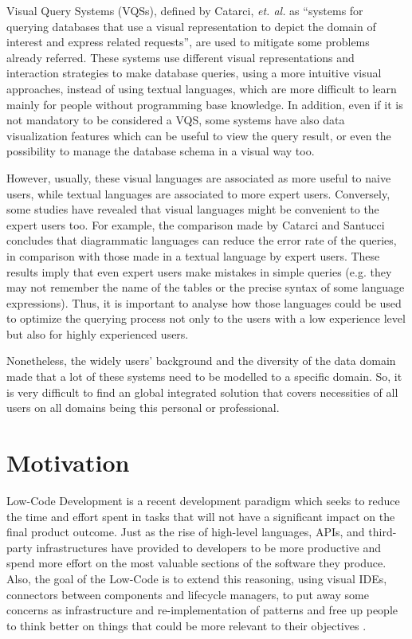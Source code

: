 Visual Query Systems (VQSs), defined by Catarci, \textit{et. al.} \cite{visualQuerySystemsForDatabases_aSurvey} as “systems for querying databases that use a visual representation to depict the domain of interest and express related requests”, are used to mitigate some problems already referred. These systems use different visual representations and interaction strategies to make database queries, using a more intuitive visual approaches, instead of using textual languages, which are more difficult to learn mainly for people without programming base knowledge. In addition, even if it is not mandatory to be considered a VQS, some systems have also data visualization features which can be useful to view the query result, or even the possibility to manage the database schema in a visual way too.

However, usually, these visual languages are associated as more useful to naive users, while textual languages are associated to more expert users.  Conversely, some studies have revealed that visual languages might be convenient to the expert users too. For example, the comparison made by Catarci and Santucci \cite{diagrammaticVsTextualQueryLanguages_aComparativeExperiment} concludes that diagrammatic languages can reduce the error rate of the queries, in comparison with those made in a textual language by expert users. These results imply that even expert users make mistakes in simple queries (e.g. they may not remember the name of the tables or the precise syntax of some language expressions). Thus, it is important to analyse how those languages could be used to optimize the querying process not only to the users with a low experience level but also for highly experienced users.

 Nonetheless, the widely users’ background and the diversity of the data domain made that a lot of these systems need to be modelled to a specific domain. So, it is very difficult to find an global integrated solution that covers necessities of all users on all domains being this personal or professional.

\section{Motivation}
\label{sec:motivation}

Low-Code Development is a recent development paradigm which seeks to reduce the time and effort spent in tasks that will not have a significant impact on the final product outcome. Just as the rise of high-level languages, APIs, and third-party infrastructures have provided to developers to be more productive and spend more effort on the most valuable sections of the software they produce. Also, the goal of the Low-Code is to extend this reasoning, using visual IDEs, connectors between components and lifecycle managers, to put away some concerns as infrastructure and re-implementation of patterns and free up people to think better on things that could be more relevant to their objectives \cite{outsystems_whatIsLowCode}.

